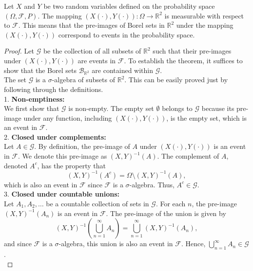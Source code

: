 \begin{theorem}
    Let \( X \) and \( Y \) be two random variables defined on the probability space \( (\Omega, \mathcal{F}, P) \). The mapping \( (X(\cdot), Y(\cdot)) : \Omega \to \mathbb{R}^2 \) is measurable with respect to \( \mathcal{F} \). This means that the pre-images of Borel sets in \( \mathbb{R}^2 \) under the mapping \( (X(\cdot), Y(\cdot)) \) correspond to events in the probability space.
\end{theorem}

\begin{proof}
    Let \( \mathcal{G} \) be the collection of all subsets of \( \mathbb{R}^2 \) such that their pre-images under \( (X(\cdot), Y(\cdot)) \) are events in \( \mathcal{F} \). To establish the theorem, it suffices to show that the Borel sets \( \mathcal{B}_{\mathbb{R}^2} \) are contained within \( \mathcal{G} \).\\

    The set \( \mathcal{G} \) is a \( \sigma \)-algebra of subsets of \( \mathbb{R}^2 \). This can be easily proved just by following through the definitions.\\

    1. \textbf{Non-emptiness:} \\
   We first show that \( \mathcal{G} \) is non-empty. The empty set \( \emptyset \) belongs to \( \mathcal{G} \) because its pre-image under any function, including \( (X(\cdot), Y(\cdot)) \), is the empty set, which is an event in \( \mathcal{F} \).\\

    2. \textbf{Closed under complements:}\\
    Let \( A \in \mathcal{G} \). By definition, the pre-image of \( A \) under \( (X(\cdot), Y(\cdot)) \) is an event in \( \mathcal{F} \). We denote this pre-image as \( (X,Y)^{-1}(A) \). The complement of \( A \), denoted \( A^c \), has the property that
    \[
    (X,Y)^{-1}(A^c) = \Omega \setminus (X,Y)^{-1}(A),
    \]
    which is also an event in \( \mathcal{F} \) since \( \mathcal{F} \) is a \( \sigma \)-algebra. Thus, \( A^c \in \mathcal{G} \).\\     

    3. \textbf{Closed under countable unions:}\\
    Let \( A_1, A_2, \ldots \) be a countable collection of sets in \( \mathcal{G} \). For each \( n \), the pre-image \( (X,Y)^{-1}(A_n) \) is an event in \( \mathcal{F} \). The pre-image of the union is given by
    \[
    (X,Y)^{-1}\left(\bigcup_{n=1}^{\infty} A_n\right) = \bigcup_{n=1}^{\infty} (X,Y)^{-1}(A_n),
    \]
    and since \( \mathcal{F} \) is a \( \sigma \)-algebra, this union is also an event in \( \mathcal{F} \). Hence, \( \bigcup_{n=1}^{\infty} A_n \in \mathcal{G} \).\\


\end{proof}
